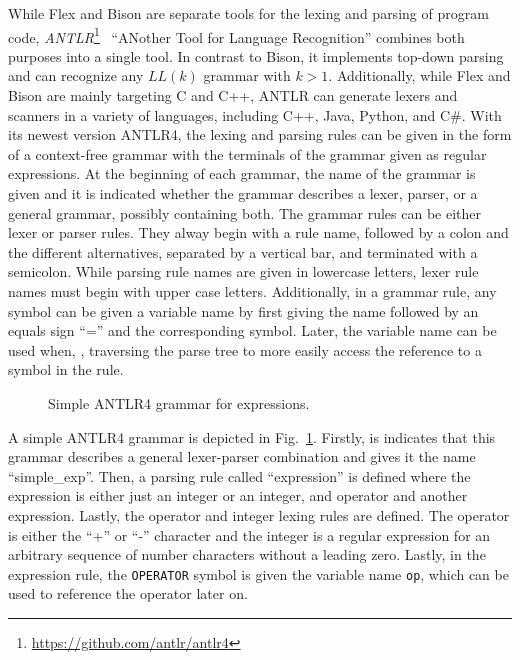 While Flex and Bison are separate tools for the lexing and parsing of program code, \emph{ANTLR}\footnote{\url{https://github.com/antlr/antlr4}}~\cite{PaQu95} ``ANother Tool for Language Recognition'' combines both purposes into a single tool. In contrast to Bison, it implements top-down parsing and can recognize any $LL(k)$ grammar with $k > 1$. Additionally, while Flex and Bison are mainly targeting C and C++, ANTLR can generate lexers and scanners in a variety of languages, including C++, Java, Python, and C\#.
With its newest version ANTLR4, the lexing and parsing rules can be given in the form of a context-free grammar with the terminals of the grammar given as regular expressions. At the beginning of each grammar, the name of the grammar is given and it is indicated whether the grammar describes a lexer, parser, or a general grammar, possibly containing both. The grammar rules can be either lexer or parser rules. They alway begin with a rule name, followed by a colon and the different alternatives, separated by a vertical bar, and terminated with a semicolon. While parsing rule names are given in lowercase letters, lexer rule names must begin with upper case letters.
Additionally, in a grammar rule, any symbol can be given a variable name by first giving the name followed by an equals sign ``='' and the corresponding symbol. Later, the variable name can be used when, \eg, traversing the parse tree to more easily access the reference to a symbol in the rule.

\begin{figure}[htp]
    \centering
    
    \caption{Simple ANTLR4 grammar for expressions.}
    \label{fig:example_antlr4}
\end{figure}

A simple ANTLR4 grammar is depicted in Fig.~\ref{fig:example_antlr4}. Firstly, is indicates that this grammar describes a general lexer-parser combination and gives it the name \mbox{``simple\_exp''}. Then, a parsing rule called ``expression'' is defined where the expression is either just an integer or an integer, and operator and another expression. Lastly, the operator and integer lexing rules are defined. The operator is either the ``+'' or ``-'' character and the integer is a regular expression for an arbitrary sequence of number characters without a leading zero. Lastly, in the expression rule, the \texttt{OPERATOR} symbol is given the variable name \texttt{op}, which can be used to reference the operator later on.